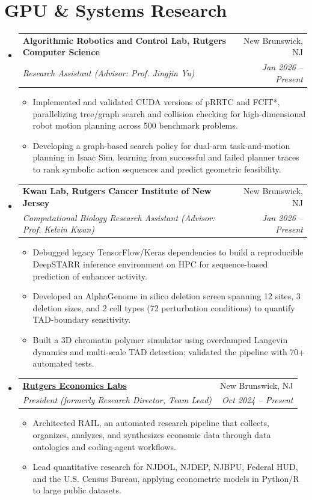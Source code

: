 \documentclass[letterpaper,11pt]{article}
\makeatletter
\newcommand{\resumeItem}[1]{
  \item\small{
    {#1 \vspace{-2pt}}
  }
}
\newcommand{\resumeSubheading}[4]{
  \vspace{-2pt}\item
    \begin{tabular*}{0.97\textwidth}[t]{l@{\extracolsep{\fill}}r}
      \textbf{#1} & #2 \\
      \textit{\small#3} & \textit{\small #4} \\
    \end{tabular*}\vspace{-7pt}
}
\newcommand{\resumeSubHeadingListStart}{\begin{itemize}[leftmargin=0.15in, label={}]}
\newcommand{\resumeSubHeadingListEnd}{\end{itemize}}
\newcommand{\resumeItemListStart}{\begin{itemize}}
\newcommand{\resumeItemListEnd}{\end{itemize}\vspace{-5pt}}
\makeatother
\begin{document}
\section{GPU \& Systems Research}
  \resumeSubHeadingListStart
    \resumeSubheading
      {Algorithmic Robotics and Control Lab, Rutgers Computer Science}{New Brunswick, NJ}
      {Research Assistant (Advisor: Prof. Jingjin Yu)}{Jan 2026 -- Present}
      \resumeItemListStart
        \resumeItem{Implemented and validated CUDA versions of pRRTC and FCIT*, parallelizing tree/graph search and collision checking for high-dimensional robot motion planning across 500 benchmark problems.}
        \resumeItem{Developing a graph-based search policy for dual-arm task-and-motion planning in Isaac Sim, learning from successful and failed planner traces to rank symbolic action sequences and predict geometric feasibility.}
      \resumeItemListEnd
    \resumeSubheading
      {Kwan Lab, Rutgers Cancer Institute of New Jersey}{New Brunswick, NJ}
      {Computational Biology Research Assistant (Advisor: Prof. Kelvin Kwan)}{Jan 2026 -- Present}
      \resumeItemListStart
        \resumeItem{Debugged legacy TensorFlow/Keras dependencies to build a reproducible DeepSTARR inference environment on HPC for sequence-based prediction of enhancer activity.}
        \resumeItem{Developed an AlphaGenome in silico deletion screen spanning 12 sites, 3 deletion sizes, and 2 cell types (72 perturbation conditions) to quantify TAD-boundary sensitivity.}
        \resumeItem{Built a 3D chromatin polymer simulator using overdamped Langevin dynamics and multi-scale TAD detection; validated the pipeline with 70+ automated tests.}
      \resumeItemListEnd
    \resumeSubheading
      {\href{https://rutgerseconomics.org}{Rutgers Economics Labs}}{New Brunswick, NJ}
      {President (formerly Research Director, Team Lead)}{Oct 2024 -- Present}
      \resumeItemListStart
        \resumeItem{Architected RAIL, an automated research pipeline that collects, organizes, analyzes, and synthesizes economic data through data ontologies and coding-agent workflows.}
        \resumeItem{Lead quantitative research for NJDOL, NJDEP, NJBPU, Federal HUD, and the U.S. Census Bureau, applying econometric models in Python/R to large public datasets.}
      \resumeItemListEnd
  \resumeSubHeadingListEnd
\end{document}
